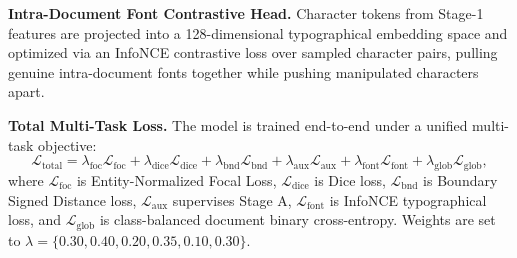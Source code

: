 \documentclass[10pt,twocolumn,letterpaper]{article}
\begin{document}
\noindent\textbf{Intra-Document Font Contrastive Head.}
Character tokens from Stage-1 features are projected into a 128-dimensional typographical embedding space and optimized via an InfoNCE contrastive loss over sampled character pairs, pulling genuine intra-document fonts together while pushing manipulated characters apart.

\noindent\textbf{Total Multi-Task Loss.}
The model is trained end-to-end under a unified multi-task objective:
\begin{equation}
    \mathcal{L}_{\text{total}} = \lambda_{\text{foc}} \mathcal{L}_{\text{foc}} + \lambda_{\text{dice}} \mathcal{L}_{\text{dice}} + \lambda_{\text{bnd}} \mathcal{L}_{\text{bnd}} + \lambda_{\text{aux}} \mathcal{L}_{\text{aux}} + \lambda_{\text{font}} \mathcal{L}_{\text{font}} + \lambda_{\text{glob}} \mathcal{L}_{\text{glob}},
\end{equation}
where $\mathcal{L}_{\text{foc}}$ is Entity-Normalized Focal Loss, $\mathcal{L}_{\text{dice}}$ is Dice loss, $\mathcal{L}_{\text{bnd}}$ is Boundary Signed Distance loss, $\mathcal{L}_{\text{aux}}$ supervises Stage A, $\mathcal{L}_{\text{font}}$ is InfoNCE typographical loss, and $\mathcal{L}_{\text{glob}}$ is class-balanced document binary cross-entropy. Weights are set to $\lambda = \{0.30, 0.40, 0.20, 0.35, 0.10, 0.30\}$.
\end{document}
